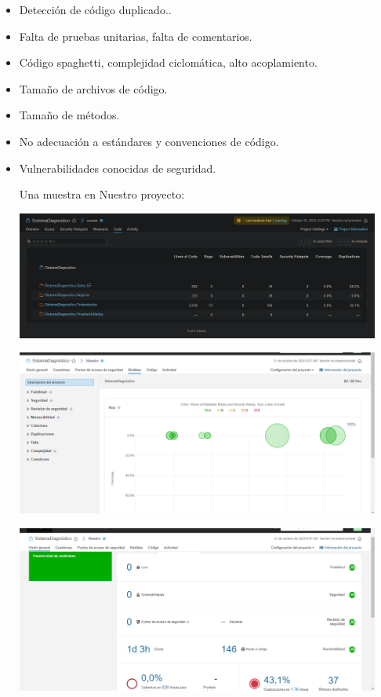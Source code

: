 \documentclass[preprint,12pt,notitlepage]{elsarticle}
\begin{document}
\begin{itemize}
	\item Detección de código duplicado..
	\item Falta de pruebas unitarias, falta de comentarios. 
	\item Código spaghetti, complejidad ciclomática, alto acoplamiento.
	\item Tamaño de archivos de código.
	\item Tamaño de métodos.
	\item No adecuación a estándares y convenciones de código.
	\item Vulnerabilidades conocidas de seguridad.
	
	Una muestra en Nuestro proyecto:
		
\begin{center}
	\includegraphics[width=12cm]{./imagen/Screenshot_2020-10-30 Code.png} 
\end{center}

\begin{center}
	\includegraphics[width=12cm]{./imagen/foto1.png} 
\end{center}

\begin{center}
	\includegraphics[width=12cm]{./imagen/foto2.png} 
\end{center}

\end{itemize}
\end{document}
